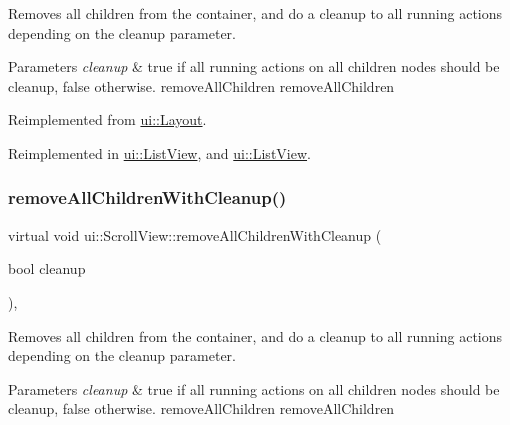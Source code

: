 Removes all children from the container, and do a cleanup to all running actions depending on the cleanup parameter.


\begin{DoxyParams}{Parameters}
{\em cleanup} & true if all running actions on all children nodes should be cleanup, false otherwise.  remove\+All\+Children  remove\+All\+Children \\
\hline
\end{DoxyParams}


Reimplemented from \hyperlink{classui_1_1Layout_a7c317fa2fc294158776962b9218304b9}{ui\+::\+Layout}.



Reimplemented in \hyperlink{classui_1_1ListView_a04bcc9bd8c55dea8f034a8380b3ab3a8}{ui\+::\+List\+View}, and \hyperlink{classui_1_1ListView_a01691c095058bc86f372e6439b15b151}{ui\+::\+List\+View}.

\mbox{\label{classui_1_1ScrollView_ab72a5f9a41f99b6b8c41596bacdd116f}} 
\subsubsection{\texorpdfstring{remove\+All\+Children\+With\+Cleanup()}{removeAllChildrenWithCleanup()}\hspace{0.1cm}{\footnotesize\ttfamily [2/2]}}
{\footnotesize\ttfamily virtual void ui\+::\+Scroll\+View\+::remove\+All\+Children\+With\+Cleanup (\begin{DoxyParamCaption}\item[{bool}]{cleanup }\end{DoxyParamCaption})\hspace{0.3cm}{\ttfamily [override]}, {\ttfamily [virtual]}}

Removes all children from the container, and do a cleanup to all running actions depending on the cleanup parameter.


\begin{DoxyParams}{Parameters}
{\em cleanup} & true if all running actions on all children nodes should be cleanup, false otherwise.  remove\+All\+Children  remove\+All\+Children \\
\hline
\end{DoxyParams}



